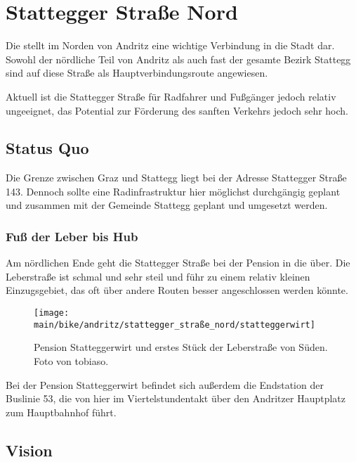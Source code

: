 \section{Stattegger Straße Nord}
Die  stellt im Norden von Andritz eine wichtige Verbindung in die Stadt dar. Sowohl der nördliche Teil von Andritz als auch fast der gesamte Bezirk Stattegg sind auf diese Straße als Hauptverbindungsroute angewiesen.

Aktuell ist die Stattegger Straße für Radfahrer und Fußgänger jedoch relativ ungeeignet, das Potential zur Förderung des sanften Verkehrs jedoch sehr hoch.

\subsection{Status Quo}

Die Grenze zwischen Graz und Stattegg liegt bei der Adresse Stattegger Straße 143. Dennoch sollte eine Radinfrastruktur hier möglichst durchgängig geplant und zusammen mit der Gemeinde Stattegg geplant und umgesetzt werden.

\subsubsection{Fuß der Leber bis Hub}
Am nördlichen Ende geht die Stattegger Straße bei der Pension  in die  über. Die Leberstraße ist schmal und sehr steil und führ zu einem relativ kleinen Einzugsgebiet, das oft über andere Routen besser angeschlossen werden könnte.

\begin{wrapfigure}{L}{0.7\textwidth}
\centering
\texttt{[image: main/bike/andritz/stattegger\_straße\_nord/statteggerwirt]}
\caption[Pension Statteggerwirt]{Pension Statteggerwirt und erstes Stück der Leberstraße von Süden. Foto von tobiaso.}
\end{wrapfigure}

Bei der Pension Statteggerwirt befindet sich außerdem die Endstation der Buslinie 53, die von hier im Viertelstundentakt über den Andritzer Hauptplatz zum Hauptbahnhof führt. 

\subsection{Vision}
